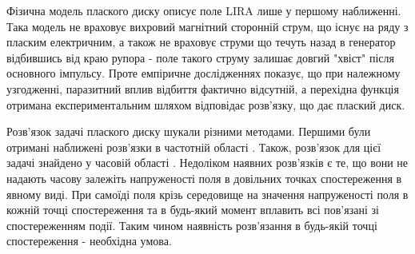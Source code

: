 Фізична модель плаского диску описує поле LIRA лише у першому наближенні.
Така модель не враховує вихровий магнітний сторонній струм, що існує на ряду 
з пласким електричним, а також не враховує струми що течуть назад в генератор 
відбившись від краю рупора - поле такого струму залишає довгий "хвіст" після 
основного імпульсу. Проте емпіричне дослідженнях 
\cite{imp:BaumSSN0396,imp:BaumSSN0401} показує, що при належному 
узгодженні, паразитний вплив відбиття фактично відсутній, а перехідна 
функція отримана експериментальним шляхом відповідає розв'язку, що дає 
плаский диск.

Розв'язок задачі плаского диску шукали різними методами. Першими були 
отримані наближені розв'язки в частотній області 
\cite{imp:Wu1985,imp:Sodin1992-10}. Також, розв'язок для цієї задачі знайдено 
у часовій області \cite{imp:Dumin1996}. Недоліком наявних розв'язків є те,
що вони не надають часову залежіть напруженості поля в довільних точках 
спостереження в явному виді. При самоїді поля крізь середовище на значення 
напруженості поля в кожній точці спостереження та в будь-який момент вплавить
всі пов'язані зі спостереженням події. Таким чином наявність розв'язання в 
будь-якій точці спостереження - необхідна умова.
%
